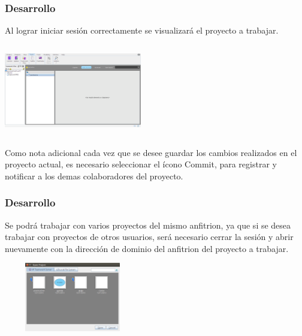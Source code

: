 \documentclass[8pt]{beamer}
\begin{document}
\begin{frame}
\frametitle{Desarrollo}
\setlength{\parskip}{10pt}
Al lograr iniciar sesión correctamente se visualizará el proyecto a trabajar.

\setlength{\parskip}{02pt}
\begin{center}
\setlength{\parskip}{08pt}
\includegraphics[width=6cm, height=4cm]{img/cap22} 
\end{center}
Como nota adicional cada vez que se desee guardar los cambios realizados en el proyecto actual, es necesario seleccionar el ícono Commit, para registrar y notificar a los demas colaboradores del proyecto.
\end{frame}

\begin{frame}
\frametitle{Desarrollo}
\setlength{\parskip}{10pt}
Se podrá trabajar con varios proyectos del mismo anfitrion, ya que si se desea trabajar con proyectos de otros usuarios, será necesario cerrar la sesión y abrir nuevamente con la dirección de dominio del anfitrion del proyecto a trabajar.

\setlength{\parskip}{02pt}
\begin{center}
\setlength{\parskip}{08pt}
\includegraphics[width=6cm, height=3cm]{img/cap21} 
\end{center}
\end{frame}
\end{document}
